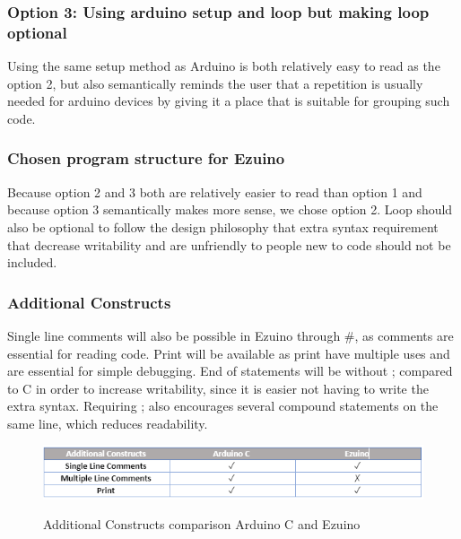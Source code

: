 \subsubsection{Option 3: Using arduino setup and loop but making loop optional}
Using the same setup method as Arduino is both relatively easy to read as the option 2, but also semantically reminds the user that a repetition is usually needed for arduino devices by giving it a place that is suitable for grouping such code.


\subsubsection{Chosen program structure for Ezuino}
Because option 2 and 3 both are relatively easier to read than option 1 and because option 3 semantically makes more sense, we chose option 2. Loop should also be optional to follow the design philosophy that extra syntax requirement that decrease writability and are unfriendly to people new to code should not be included.

\subsubsection*{Additional Constructs}
Single line comments will also be possible in Ezuino through \#, as comments are essential for reading code. Print will be available as print have multiple uses and are essential for simple debugging. End of statements will be without ; compared to C in order to increase writability, since it is easier not having to write the extra syntax. Requiring ; also encourages several compound statements on the same line, which reduces readability.
\begin{figure}[H]
\centering
\caption{Additional Constructs comparison Arduino C and Ezuino}
\includegraphics[scale=0.60]{figures/language_features/langf09.png}
\label{lf09}
\end{figure}

